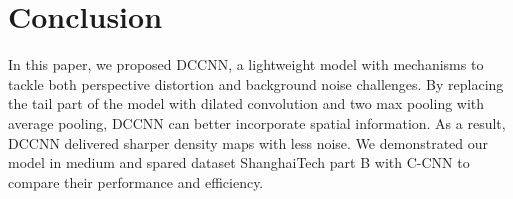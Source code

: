 \section{Conclusion} \label{sec:conclusion}

In this paper, we proposed DCCNN, a lightweight model with mechanisms to tackle both perspective distortion and background noise challenges. By replacing the tail part of the model with dilated convolution and two max pooling with average pooling, DCCNN can better incorporate spatial information. As a result, DCCNN delivered sharper density maps with less noise. We demonstrated our model in medium and spared dataset ShanghaiTech part B \cite{zhang2016single} with C-CNN \cite{9053780} to compare their performance and efficiency.

